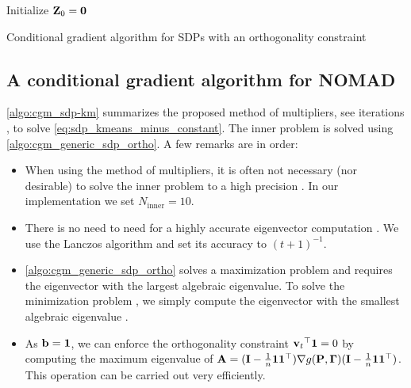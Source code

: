 \documentclass[twoside,11pt]{article}
\begin{document}
\begin{algorithm2e}[t]
	\SetNoFillComment

	\begin{small}
    
	Initialize
    ${\mathbf{Z}}_0 = {\mathbf{0}}$\;
    \end{small}
	
	\caption{Conditional gradient algorithm for SDPs with an orthogonality constraint}
	\label{algo:cgm_generic_sdp_ortho}
\end{algorithm2e}

\subsection{A conditional gradient algorithm for NOMAD}

\cref{algo:cgm_sdp-km} summarizes the proposed method of multipliers, see iterations , to solve \cref{eq:sdp_kmeans_minus_constant}. The inner problem  is solved using \cref{algo:cgm_generic_sdp_ortho}. A few remarks are in order:
\begin{itemize}[nosep]
	\item When using the method of multipliers, it is often not necessary (nor desirable) to solve the inner problem to a high precision \citep{Goldstein2009}. In our implementation we set $N_{\text{inner}} = 10$.
    \item There is no need to need for a highly accurate eigenvector computation \citep{Hazan2008sdp}. We use the Lanczos algorithm and set its accuracy to $(t + 1)^{-1}$.
    \item \cref{algo:cgm_generic_sdp_ortho} solves a maximization problem and requires the eigenvector with the largest algebraic eigenvalue. To solve the minimization problem , we simply compute the eigenvector with the smallest algebraic eigenvalue \citep{Jaggi2013}.
	\item As ${\mathbf{b}} = {\mathbf{1}}$, we can enforce the orthogonality constraint ${{\mathbf{v}}_t}^\top {\mathbf{1}} = 0$ by computing the maximum eigenvalue of ${\mathbf{A}} = ({\mathbf{I}} - \tfrac{1}{n} {\mathbf{1}} {{\mathbf{1}}}^\top) \nabla g({\mathbf{P}}, {\mathbf{\Gamma}}) ({\mathbf{I}} - \tfrac{1}{n} {\mathbf{1}} {{\mathbf{1}}}^\top)$. This operation can be carried out very efficiently.
\end{itemize}
\end{document}
